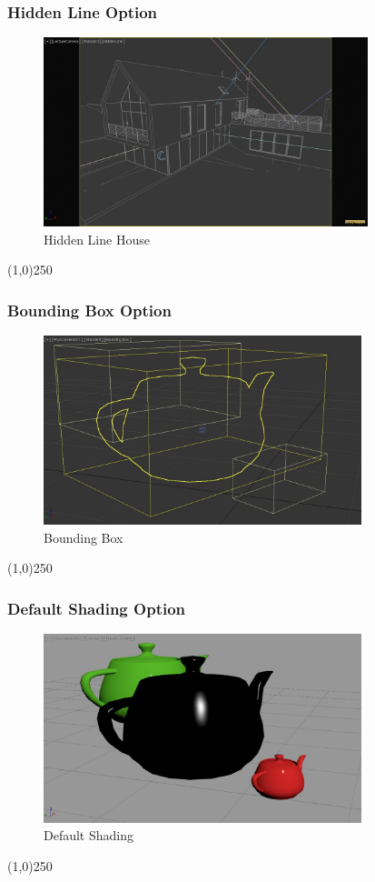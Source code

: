 \begin{frame}
\frametitle{Hidden Line Option}
\begin{figure}
	\centering
	\includegraphics[height=5.5cm]{img/ViewportOptions/HiddenLineHouse.jpg}
	\caption{Hidden Line House}
	\label{fig:HiddenLineHouse}
\end{figure}
\end{frame}
\begin{center}\line(1,0){250}\end{center}

\begin{frame}
\frametitle{Bounding Box Option}
\begin{figure}
	\centering
	\includegraphics[height=5.5cm]{img/ViewportOptions/BoundingBox.jpg}
	\caption{Bounding Box}
	\label{fig:BoundingBox}
\end{figure}
\end{frame}
\begin{center}\line(1,0){250}\end{center}

\begin{frame}
\frametitle{Default Shading Option}
\begin{figure}
	\centering
	\includegraphics[height=5.5cm]{img/ViewportOptions/DefaultShading.jpg}
	\caption{Default Shading}
	\label{fig:DefaultShading}
\end{figure}
\end{frame}
\begin{center}\line(1,0){250}\end{center}

